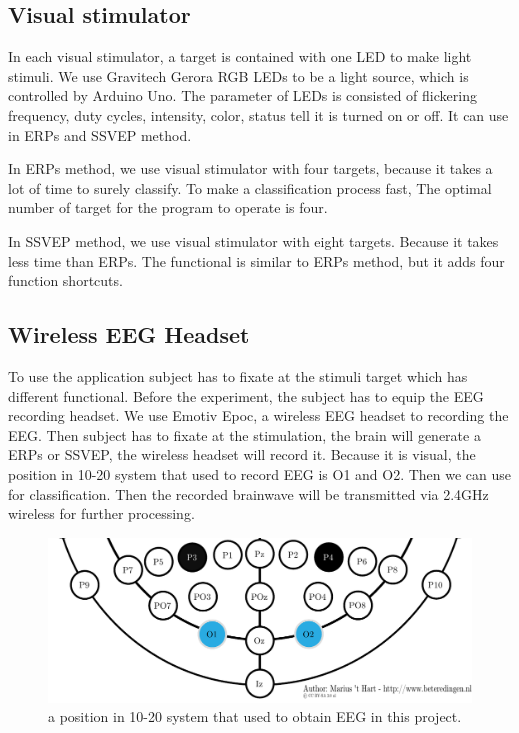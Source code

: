 \subsection{Visual stimulator}

\hspace{1.5cm}In each visual stimulator, a target is contained with one LED to make light stimuli. We use Gravitech Gerora RGB LEDs to be a light source, which is controlled by Arduino Uno.  The parameter of LEDs is consisted of flickering frequency, duty cycles, intensity, color, status tell it is turned on or off. It can use in ERPs and SSVEP method. 

In ERPs method, we use visual stimulator with four targets, because it takes a lot of time to surely classify. To make a classification process fast, The optimal number of target for the program to operate is four.

In SSVEP method, we use visual stimulator with eight targets. Because it takes less time than ERPs. The functional is similar to ERPs method, but it adds four function shortcuts.

\subsection{Wireless EEG Headset}
\hspace{1.5cm}To use the application subject has to fixate at the stimuli target which has different functional. Before the experiment, the subject has to equip the EEG recording headset. We use Emotiv Epoc, a wireless EEG headset to recording the EEG. Then subject has to fixate at the stimulation, the brain will generate a ERPs or SSVEP, the wireless headset will record it. Because it is visual, the position in 10-20 system that used to record EEG is O1 and O2. Then we can use for classification. Then the recorded brainwave will be transmitted via 2.4GHz wireless for further processing.
\begin{figure}[ht]
	\centering
	\includegraphics[scale = 0.4]{chapter5/emotiv_electrodes_use.pdf}
	\caption{a position in 10-20 system that used to obtain EEG in this project.}
\end{figure}
